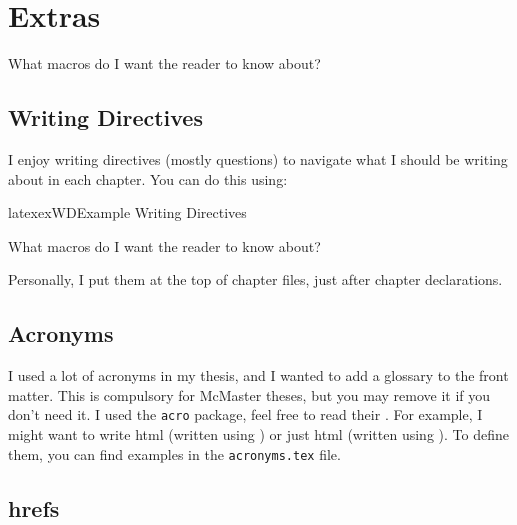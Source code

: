 \chapter{Extras}
\label{chap:extras}

\begin{writingdirectives}

    \item What macros do I want the reader to know about?
    
\end{writingdirectives}

\section{Writing Directives}
\label{chap:extras:sec:writing-directives}

I enjoy writing directives (mostly questions) to navigate what I should be
writing about in each chapter. You can do this using:

\begin{pseudocode}{latex}{exWD}{Example Writing Directives}
\begin{writingdirectives}
    \item What macros do I want the reader to know about?
\end{writingdirectives}
\end{pseudocode}

Personally, I put them at the top of chapter files, just after chapter
declarations.

\section{Acronyms}
\label{chap:extras:sec:acronyms}

I used a lot of acronyms in my thesis, and I wanted to add a glossary to the
front matter. This is compulsory for McMaster theses, but you may remove it if
you don't need it. I used the \texttt{acro} package, feel free to read their
. For example, I
might want to write \acf{html} (written using ) or
just \acs{html} (written using ). To define them,
you can find examples in the \texttt{acronyms.tex} file.

\section{\acsp{href}}
\label{chap:extras:sec:hrefs}

